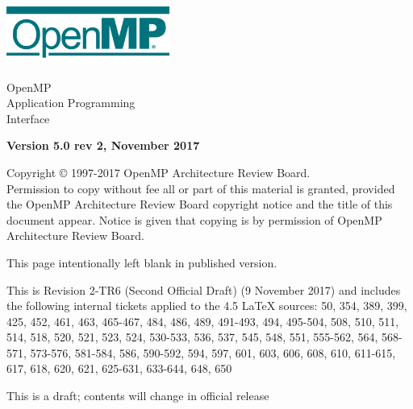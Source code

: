
  \begin{titlepage}
    \begin{flushleft}
     \hspace{-6em} \includegraphics[width=0.4\textwidth]{openmp-logo.png}
    \end{flushleft}

    \begin{adjustwidth}{-0.75in}{0in}
    \begin{center}
      \Huge
      \textsf{OpenMP\\Application Programming\\Interface}

      \vspace{0.5in}\textsf{    }\vspace{-0.7in}
      \normalsize

      \vspace{1.0in}

      \textbf{Version 5.0 rev 2, November 2017}
    \end{center}
    \end{adjustwidth}

    \vspace{3.0in}

\begin{adjustwidth}{0pt}{1em}\setlength{\parskip}{0.25\baselineskip}%
Copyright © 1997-2017 OpenMP Architecture Review Board.\\
Permission to copy without fee all or part of this material is granted,
provided the OpenMP Architecture Review Board copyright notice and
the title of this document appear. Notice is given that copying is by
permission of OpenMP Architecture Review Board.\end{adjustwidth}

  \end{titlepage}


\clearpage
\thispagestyle{empty}
\phantom{a}
This page intentionally left blank in published version.

This is Revision 2-TR6 (Second Official Draft) (9 November 2017) and 
includes the following internal tickets applied to the 4.5 LaTeX sources: 
50, 354, 389, 399, 425, 452, 461, 463, 465-467, 484, 486, 489, 491-493, 494, 
495-504, 508, 510, 511, 514, 518, 520, 521, 523, 524, 530-533, 536, 537, 
545, 548, 551, 555-562, 564, 568-571, 573-576, 581-584, 586, 590-592, 594, 
597, 601, 603, 606, 608, 610, 611-615, 617, 618, 620, 621, 625-631, 633-644, 
648, 650

This is a draft; contents will change in official release

\vfill

